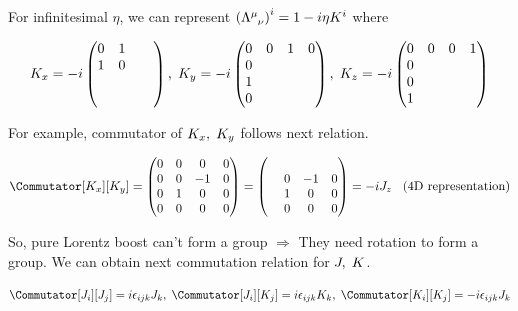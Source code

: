 \documentclass[11pt,letterpaper]{article}
\begin{document}
For infinitesimal $\eta$, we can represent $\BKS{\tensor{\Lambda}{^\mu_\nu}}^i = 1- i\eta K^i$ where 

\begin{align}
 K_x = -i 
 \begin{pmatrix}
  0 & 1 & & \\
  1 & 0 & & \\
  & & &  \\
  & & & 
 \end{pmatrix}
 ,\hspace{0.1cm} K_y = - i
 \begin{pmatrix}
   0 & 0 & 1 & 0 \\
   0 & & & \\
   1 & & & \\
   0 & & &
 \end{pmatrix}
 ,\hspace{0.1cm} K_z = -i
 \begin{pmatrix}
  0 & 0 & 0 & 1 \\
  0 & & & \\
  0 & & & \\
  1 & & &
 \end{pmatrix}
\end{align}

\VS

For example, commutator of $K_x,\hspace{0.1cm} K_y$ follows next relation.

\begin{align}
 \Commutator[K_x][K_y] =
 \begin{pmatrix}
  0 & 0 & 0 & 0 \\
  0 & 0 & -1 & 0 \\
  0 & 1 & 0 & 0 \\
  0 & 0 & 0 & 0
 \end{pmatrix}
 = 
 \begin{pmatrix}
  \hs & & & \\
  \hs & 0 & -1 & 0 \\
  \hs & 1 & 0 & 0 \\
  \hs & 0 & 0 & 0
 \end{pmatrix}
 = - i J_z \HS \text{(4D representation)}
\end{align}

\VS

So, pure Lorentz boost can't form a group $\Rightarrow$ They need rotation to form a group. \newline
We can obtain next commutation relation for $J,\hspace{0.1cm} K$.

\begin{equation}
 \Commutator[J_i][J_j]=i\eps_{ijk}J_k\Com \Commutator[J_i][K_j] = i\eps_{ijk}K_k\Com \Commutator[K_i][K_j] = -i\eps_{ijk}J_k
\end{equation}
\end{document}
